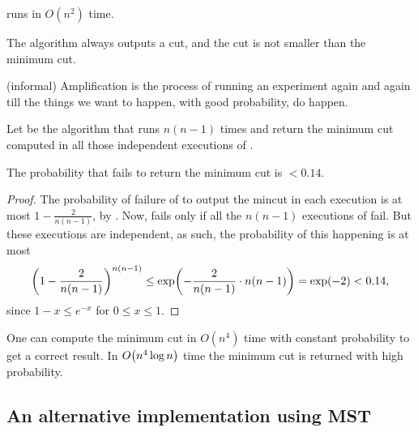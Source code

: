 \begin{observation}
    \MinCut{} runs in $O( n^{2} )$ time.
\end{observation}

\begin{observation}
    The algorithm always outputs a cut, and the cut is not smaller
    than the minimum cut.
\end{observation}

\begin{defn}
    (informal) Amplification is the process of running an experiment
    again and again till the things we want to happen, with good
    probability, do happen.
\end{defn}

Let \MinCutRep{} be the algorithm that runs \MinCut{} $n(n-1)$ times
and return the minimum cut computed in all those independent
executions of \MinCut{}.

\begin{lemma}
    The probability that \MinCutRep{} fails to return the minimum cut
    is $< 0.14$.
    
\end{lemma}
\begin{proof}
    The probability of failure of \MinCut{} to output the mincut in each
    execution is at most $1-\frac{2}{n( n-1)}$, by
    . Now, \MinCutRep{} fails only if all the $n
    (n-1)$ executions of \MinCut{} fail. But these executions are
    independent, as such, the probability of this happening is at most
    \begin{align*}
        \pth{1-\frac{2}{n
              (n-1)}}^{n(n-1)}\leq\exp\pth{-\frac{2}{n(n-1)}\cdot
           n(n-1)}=\exp(-2)<0.14,
    \end{align*}
    since $1-x\leq e^{-x}$ for $0\leq x\leq 1$.
\end{proof}

\begin{theorem}   
    One can compute the minimum cut in $O(n^{4})$ time with constant
    probability to get a correct result. In $O\pth{n^{4}\log n}$ time
    the minimum cut is returned with high probability.
\end{theorem}


\subsection{An alternative implementation using MST}

